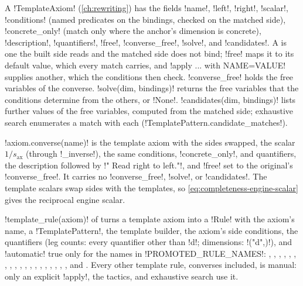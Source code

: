 A \py!TemplateAxiom! (\cref{ch:rewriting}) has the fields \py!name!, \py!left!, \py!right!,
\py!scalar!, \py!conditions! (named predicates on the bindings, checked on the matched side),
\py!concrete_only! (match only where the anchor's dimension is concrete), \py!description!,
\py!quantifiers!, \py!free!, \py!converse_free!, \py!solve!, and \py!candidates!. A  is one the built side reads and the matched side does not bind; \py!free! maps it to its
default value, which every match carries, and \azx!apply ... with NAME=VALUE! supplies another,
which the conditions then check. \py!converse_free! holds the free variables of the converse.
\py!solve(dim, bindings)! returns the free variables that the conditions determine from the
others, or \py!None!. \py!candidates(dim, bindings)! lists further values of the free variables,
computed from the matched side; exhaustive search enumerates a match with each
(\py!TemplatePattern.candidate_matches!).

\begin{definition}[Converse]\label{def:completeness-converse}
\py!axiom.converse(name)! is the template axiom with the sides swapped, the scalar
$1/s_{\mathrm{ax}}$ (through \py!_inverse!), the same conditions, \py!concrete_only!, and
quantifiers, the description followed by \code!" Read right to left."!, and \py!free! set to the
original's \py!converse_free!. It carries no \py!converse_free!, \py!solve!, or \py!candidates!.
The template scalars swap sides with the templates, so \cref{eq:completeness-engine-scalar}
gives the reciprocal engine scalar.
\end{definition}

\py!template_rule(axiom)! of  turns a template axiom into
a \py!Rule! with the axiom's name, a \py!TemplatePattern!, the template builder, the axiom's side
conditions, the quantifiers (leg counts: every quantifier other than \code!d!; dimensions:
\code!("d",)!), and \py!automatic! true only for the names in \py!PROMOTED_RULE_NAMES!:
, , , , ,
, , , , ,
, , , , , ,
, , , and . Every other template rule,
converses included, is manual: only an explicit \azx!apply!, the tactics, and exhaustive search
use it.

\providecommand{\cmplhead}[2]{\par\medskip\noindent\textbf{\cmplr{#1}}\quad #2\par\nopagebreak\smallskip}

